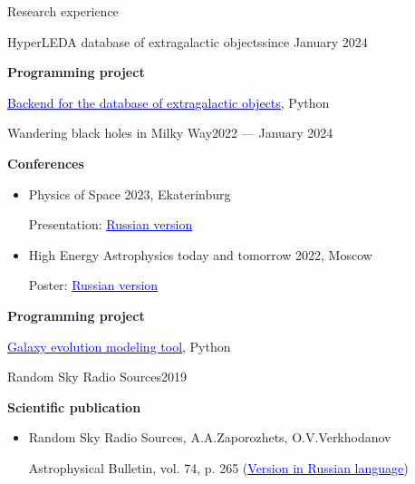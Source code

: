\documentclass{resume} %
\newcommand{\link}[2]{\href{#1}{\textcolor{blue}{\underline{#2}}}}
\newcommand{\subheader}[2]{
	{\textbf{#1}} \ifthenelse{\equal{#2}{}}{}{\timestamp{#2}}
}
\begin{document}
	\begin{rSection}{Research experience}
		\begin{rSubsection}{HyperLEDA database of extragalactic objects}{since January 2024}{}{}{}
			\item \subheader{Programming project}{} 

			\link{https://github.com/HyperLEDA/db-app}{Backend for the database of extragalactic objects}, Python 
		\end{rSubsection}

		\begin{rSubsection}{Wandering black holes in Milky Way}{2022 --- January 2024}{}{}{}
			\item \subheader{Conferences}{}
			\begin{itemize}
				\item Physics of Space 2023, Ekaterinburg 
				
				Presentation: \link{https://www.overleaf.com/read/mnwwgvkqxdky}{Russian version}
				\item High Energy Astrophysics today and tomorrow 2022, Moscow 
				
				Poster: \link{https://www.overleaf.com/read/cwyptqpmdtdf}{Russian version}
			\end{itemize}

			\item \subheader{Programming project}{}

			\link{https://github.com/Kraysent/OMTool}{Galaxy evolution modeling tool}, Python 
		\end{rSubsection}

		\begin{rSubsection}{Random Sky Radio Sources}{2019}{}{}{}
			\item \subheader{Scientific publication}{}
			\begin{itemize}
				\item Random Sky Radio Sources, A.A.Zaporozhets, O.V.Verkhodanov 
			
				Astrophysical Bulletin, vol. 74, p. 265 (\link{http://www.sao.ru/Doc-k8/Science/Public/Bulletin/Vol74/N3/ASPB265.pdf}{Version in Russian language})
			\end{itemize}	
		\end{rSubsection}
	\end{rSection}
\end{document}
